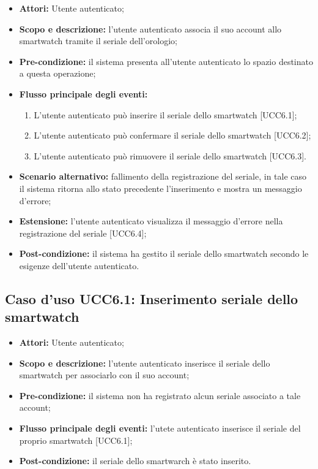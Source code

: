 \begin{itemize}
\item \textbf{Attori:} Utente autenticato;
\item \textbf{Scopo e descrizione:} l'utente autenticato associa il suo account allo smartwatch tramite il seriale dell'orologio;
\item \textbf{Pre-condizione:} il sistema presenta all'utente autenticato lo spazio destinato a questa operazione;
\item \textbf{Flusso principale degli eventi:}
\begin{enumerate}
\item L'utente autenticato può inserire il seriale dello smartwatch [UCC6.1];
\item L'utente autenticato può confermare il seriale dello smartwatch [UCC6.2];
\item L'utente autenticato può rimuovere il seriale dello smartwatch [UCC6.3].
\end{enumerate}
\item \textbf{Scenario alternativo:} fallimento della registrazione del seriale, in tale caso il sistema ritorna allo stato precedente l'inserimento e mostra un messaggio d'errore;
\item \textbf{Estensione:} l'utente autenticato visualizza il messaggio d'errore nella registrazione del seriale [UCC6.4];
\item \textbf{Post-condizione:} il sistema ha gestito il seriale dello smartwatch secondo le esigenze dell'utente autenticato.
\end{itemize}

\subsection{Caso d'uso UCC6.1: Inserimento seriale dello smartwatch}

\begin{itemize}
\item \textbf{Attori:} Utente autenticato;
\item \textbf{Scopo e descrizione:} l'utente autenticato inserisce il seriale dello smartwatch per associarlo con il suo account;
\item \textbf{Pre-condizione:} il sistema non ha registrato alcun seriale associato a tale account;
\item \textbf{Flusso principale degli eventi:} l'utete autenticato inserisce il seriale del proprio smartwatch [UCC6.1];
\item \textbf{Post-condizione:} il seriale dello smartwarch è stato inserito.
\end{itemize}


